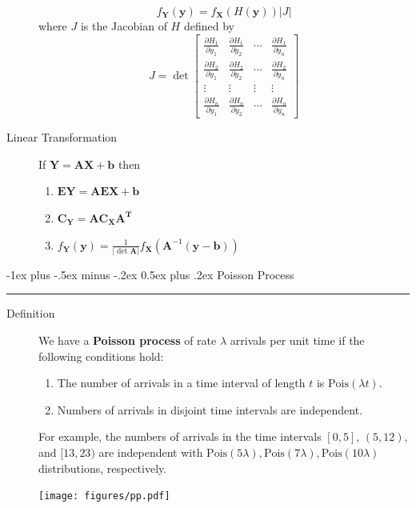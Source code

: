 \documentclass[10pt,landscape]{article}
\makeatletter
\newcommand{\Pois}{\textrm{Pois}}
\renewcommand{\section}{\@startsection{section}{1}{0mm}%
                                {-1ex plus -.5ex minus -.2ex}%
                                {0.5ex plus .2ex}%
                                {\normalfont\large\bfseries}}
\makeatother
\begin{document}
\begin{multicols*}{3}
\begin{description}
		\[
			f_{\mathbf{Y}}(\mathbf{y})=f_{\mathbf{X}}(H(\mathbf{y}))|J|
		\]
		where $J$ is the Jacobian of $H$ defined by
		\[
			J=\det \left[\begin{array}{cccc}
				\frac{\partial H_{1}}{\partial y_{1}} & \frac{\partial H_{1}}{\partial y_{2}} & \cdots & \frac{\partial H_{1}}{\partial y_{n}} \\
				\frac{\partial H_{2}}{\partial y_{1}} & \frac{\partial H_{2}}{\partial y_{2}} & \cdots & \frac{\partial H_{2}}{\partial y_{n}} \\
				\vdots & \vdots & \vdots & \vdots \\
				\frac{\partial H_{n}}{\partial y_{1}} & \frac{\partial H_{n}}{\partial y_{2}} & \cdots & \frac{\partial H_{n}}{\partial y_{n}}
			\end{array}\right]
		\]
		\item[Linear Transformation] If $\mathbf{Y} = \mathbf{AX + b}$ then 
		\begin{enumerate}
			\item $\mathbf{EY} = \mathbf{AEX + b}$
			\item $\mathbf{C}_{\mathbf{Y}}=\mathbf{A} \mathbf{C}_{\mathbf{X}} \mathbf{A}^{\mathbf{T}}$
			\item $f_{\mathbf{Y}}(\mathbf{y})=\frac{1}{|\det{\mathbf{A}}|} f_{\mathbf{X}}\left(\mathbf{A}^{-1}(\mathbf{y}-\mathbf{b})\right)$
		\end{enumerate}
	\end{description}
					
	\section{Poisson Process}\smallskip \hrule height 2pt \smallskip
	\begin{description}
		\item[Definition] We have a \textbf{Poisson process} of rate $\lambda$ arrivals per unit time if the following conditions hold:
		\begin{enumerate}
			\item The number of arrivals in a time interval of length $t$ is $\Pois(\lambda t)$.
			\item Numbers of arrivals in disjoint time intervals are independent.
		\end{enumerate}
		For example, the numbers of arrivals in the time intervals $[0,5]$, $(5,12),$ and $[13,23)$ are independent with $\Pois(5\lambda), \Pois(7\lambda), \Pois(10\lambda)$ distributions, respectively.
		\begin{minipage}{\linewidth}
			\centering
			\texttt{[image: figures/pp.pdf]}
		\end{minipage}
										       

\end{description}
\end{multicols*}
\end{document}
